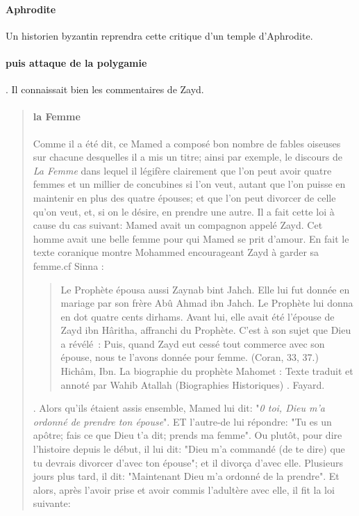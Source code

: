 \paragraph{Aphrodite} Un historien byzantin reprendra cette critique d'un temple d'Aphrodite.

\paragraph{puis attaque de la polygamie}. 
Il connaissait bien les commentaires de Zayd. 

\begin{quote}
    

\paragraph{la Femme}
Comme il a été dit, ce Mamed a composé bon nombre de fables oiseuses sur chacune desquelles il a mis un titre; ainsi par exemple, le discours de \textit{La Femme} dans lequel il légifère clairement que l'on peut avoir quatre femmes et un millier de concubines si l'on veut, autant que l'on puisse en maintenir en plus des quatre épouses; et que l'on peut divorcer de celle qu'on veut, et, si on le désire, en prendre une autre. Il a fait cette loi à cause du cas suivant: Mamed avait un compagnon appelé Zayd. Cet homme avait une belle femme pour qui Mamed se prit d'amour. En fait le texte coranique montre Mohammed encourageant Zayd à
garder sa femme.cf Sinna : 
\begin{quote}
Le Prophète épousa aussi Zaynab bint Jahch. Elle lui fut donnée en mariage par son frère Abû Ahmad ibn Jahch. Le Prophète lui donna en dot quatre cents dirhams. Avant lui, elle avait été l'épouse de Zayd ibn Hâritha, affranchi du Prophète. C'est à son sujet que Dieu a révélé : Puis, quand Zayd eut cessé tout commerce avec son épouse, nous te l'avons donnée pour femme. (Coran, 33, 37.)
Hichâm, Ibn. La biographie du prophète Mahomet : Texte traduit et annoté par Wahib Atallah (Biographies Historiques)  . Fayard. 
\end{quote}. Alors qu'ils étaient assis ensemble, Mamed lui dit: "\textit{0 toi, Dieu m'a ordonné de prendre ton épouse}". ET l'autre-de lui répondre: "Tu es un apôtre; fais ce que Dieu t'a dit; prends ma femme". Ou plutôt, pour dire l'histoire depuis le début, il lui dit: "Dieu m'a commandé (de te dire) que tu devrais divorcer d'avec ton épouse"; et il divorça d'avec elle. Plusieurs jours plus tard, il dit: "Maintenant Dieu m'a ordonné de la prendre". Et alors, après l'avoir prise et avoir commis l'adultère avec elle, il fit la loi suivante: \begin{quote}

\end{quote}
\end{quote}
